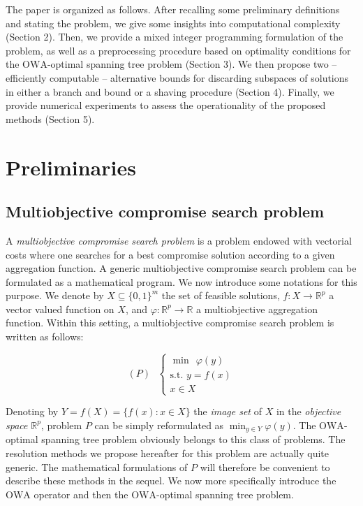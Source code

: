 \documentclass[final,3p,times]{elsarticle}
\newcommand{\owa}{\mbox{OWA}}
\newcommand{\RP}{\mathbb{R}^p}
\newcommand{\R}{\mathbb{R}}
\begin{document}
The paper is organized as follows. After recalling some preliminary
definitions and stating the problem, we give some insights into computational complexity (Section 2). Then, we provide a mixed integer programming formulation of the problem, as well as a preprocessing procedure based on optimality conditions for the $\owa$-optimal spanning tree problem (Section 3). We then propose two -- efficiently computable -- alternative bounds for discarding subspaces
of solutions in either a branch and bound or a shaving procedure (Section 4). Finally, we provide numerical experiments to assess the operationality of the proposed methods (Section 5). 


\section{Preliminaries}
\label{sec:OWA}


\subsection{Multiobjective compromise search problem}
\label{sec:comp}

A \emph{multiobjective compromise search problem} is a
problem endowed with vectorial costs where one searches for a best
compromise solution according to a given aggregation function. A generic multiobjective compromise search problem can be formulated as a mathematical program.
We now introduce some notations for this purpose. 
We denote by $X \subseteq \{0,1\}^m$ the set of feasible
solutions, $f:X \rightarrow \RP$ a vector valued function on $X$, and $\varphi:\RP \rightarrow \R$ a multiobjective aggregation function. Within this setting, a multiobjective compromise search problem is written as follows: 

$$(P) ~~~\left\{\begin{array}{ll}
 \min ~~ \varphi(y)\\\mbox{s.t. } y  =  f(x)\\
 x  \in  X
\end{array}\right. $$    

Denoting by $Y= f(X) = \{f(x): x \in X\}$ the \emph{image set} of $X$ in the \emph{objective space} $\RP$, problem $P$ can be simply reformulated as $\min_{y \in Y} \varphi(y)$. The $\owa$-optimal spanning tree problem obviously belongs to this class of
problems. The resolution methods we propose hereafter for this problem are actually quite generic. 
The mathematical formulations of $P$ will therefore be convenient to describe these methods in the sequel.
We now more specifically introduce the $\owa$ operator and then the $\owa$-optimal spanning tree problem.
\end{document}
